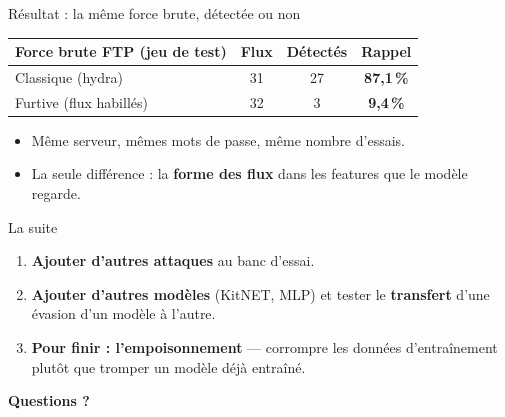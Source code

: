 \documentclass[aspectratio=169,11pt,xcolor=table]{beamer}
\newcommand{\espacement}{\setlength{\itemsep}{.7em}}
\begin{document}
\begin{frame}{Résultat : la même force brute, détectée ou non}
  \centering
  \renewcommand{\arraystretch}{1.3}
  \begin{tabular}{@{}lccc@{}}
    \toprule
    \textbf{Force brute FTP} (jeu de test) & \textbf{Flux} & \textbf{Détectés} & \textbf{Rappel} \\
    \midrule
    \rowcolor{attaque!20} Classique (hydra) & 31 & 27 & \textbf{87,1\,\%} \\
    \rowcolor{benin!35} Furtive (flux habillés) & 32 & 3 & \textbf{9,4\,\%} \\
    \bottomrule
  \end{tabular}
  \vspace{1em}

  \begin{itemize}\espacement
    \item Même serveur, mêmes mots de passe, même nombre d'essais.
    \item La seule différence : la \textbf{forme des flux} dans les features que le modèle regarde.
  \end{itemize}
\end{frame}

\begin{frame}{La suite}
  \begin{enumerate}\espacement
    \item \textbf{Ajouter d'autres attaques} au banc d'essai.
    \item \textbf{Ajouter d'autres modèles} (KitNET, MLP) et tester le \textbf{transfert} d'une évasion d'un modèle à l'autre.
    \item \textbf{Pour finir : l'empoisonnement} — corrompre les données d'entraînement plutôt que tromper un modèle déjà entraîné.
  \end{enumerate}
  \vfill
  \centering
  {\large\bfseries\color{projectblue} Questions ?}
\end{frame}
\end{document}
